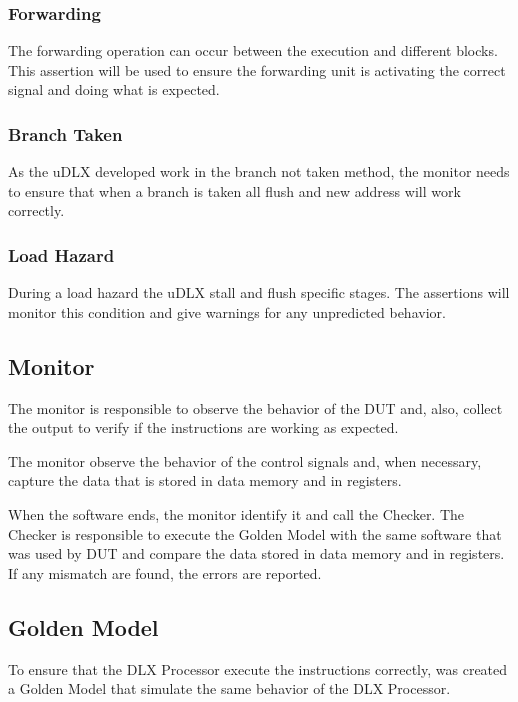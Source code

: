 \documentclass{article}
\begin{document}
	\subsubsection{Forwarding}
	
	The forwarding operation can occur between the execution and different blocks. This assertion will be used to ensure the forwarding unit is activating the correct signal and doing what is expected.
	
	\subsubsection{Branch Taken}
	
	As the uDLX developed work in the branch not taken method, the monitor needs to ensure that when a branch is taken all flush and new address will work correctly.
	
	\subsubsection{Load Hazard}

	During a load hazard the uDLX stall and flush specific stages. The assertions will monitor this condition and give warnings for any unpredicted behavior.	
	
	\subsection{Monitor}
	
	The monitor is responsible to observe the behavior of the DUT and, also, collect the output to verify if the instructions are working as expected.
	
	The monitor observe the behavior of the control signals and, when necessary, capture the data that is stored in data memory and in registers.
	
	When the software ends, the monitor identify it and call the Checker.
The Checker is responsible to execute the Golden Model with the same software that was used by DUT and compare the data stored in data memory and in registers. If any mismatch are found, the errors are reported.

	\subsection{Golden Model}
	To ensure that the DLX Processor execute the instructions correctly, was created a Golden Model that simulate the same behavior of the DLX Processor.
	
\end{document}
